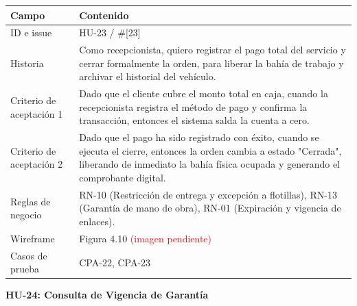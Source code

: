 {\def\LTcaptype{none} %
\begin{longtable}[]{@{}
  >{\raggedright\arraybackslash}p{}
  >{\raggedright\arraybackslash}p{}@{}}
\toprule\noalign{}
\begin{minipage}[b]{\linewidth}\raggedright
\textbf{Campo}
\end{minipage} & \begin{minipage}[b]{\linewidth}\raggedright
\textbf{Contenido}
\end{minipage} \\
\midrule\noalign{}
\endhead
\bottomrule\noalign{}
\endlastfoot
ID e issue & HU-23 / \#{[}23{]} \\
Historia & Como recepcionista, quiero registrar el pago total del
servicio y cerrar formalmente la orden, para liberar la bahía de trabajo
y archivar el historial del vehículo. \\
Criterio de aceptación 1 & Dado que el cliente cubre el monto total en
caja, cuando la recepcionista registra el método de pago y confirma la
transacción, entonces el sistema salda la cuenta a cero. \\
Criterio de aceptación 2 & Dado que el pago ha sido registrado con
éxito, cuando se ejecuta el cierre, entonces la orden cambia a estado
"Cerrada", liberando de inmediato la bahía física ocupada y generando el
comprobante digital. \\
Reglas de negocio & RN-10 (Restricción de entrega y excepción a
flotillas), RN-13 (Garantía de mano de obra), RN-01 (Expiración y
vigencia de enlaces). \\
Wireframe & Figura 4.10 \textcolor{red}{(imagen pendiente)} \\
Casos de prueba & CPA-22, CPA-23 \\
\end{longtable}
}

\textbf{HU-24: Consulta de Vigencia de Garantía}

